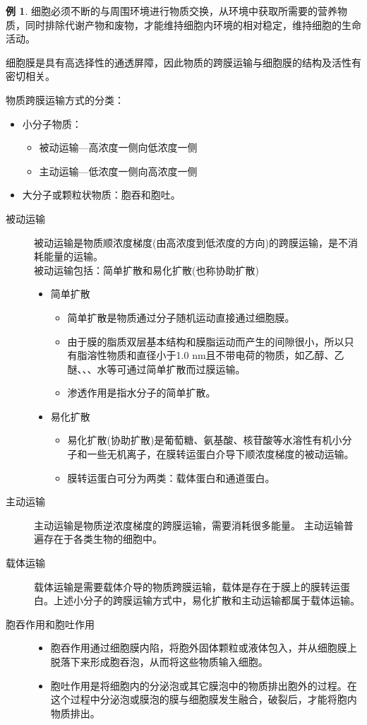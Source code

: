 \documentclass[UTF8]{article}
\theoremstyle{definition}
\newtheorem{example}{例}[section]
\begin{document}
\begin{example}
细胞必须不断的与周围环境进行物质交换，从环境中获取所需要的营养物质，同时排除代谢产物和废物，才能维持细胞内环境的相对稳定，维持细胞的生命活动。 

细胞膜是具有高选择性的通透屏障，因此物质的跨膜运输与细胞膜的结构及活性有密切相关。

物质跨膜运输方式的分类：
\begin{itemize}
    \item 小分子物质：\begin{itemize}
        \item 被动运输---高浓度一侧向低浓度一侧\item 主动运输---低浓度一侧向高浓度一侧
    \end{itemize}
    \item 大分子或颗粒状物质：胞吞和胞吐。
\end{itemize}
\begin{description}
    \item[被动运输] 被动运输是物质顺浓度梯度(由高浓度到低浓度的方向)的跨膜运输，是不消耗能量的运输。\\ 被动运输包括：简单扩散和易化扩散(也称协助扩散)\begin{itemize}
        \item 简单扩散\begin{itemize}
            \item 简单扩散是物质通过分子随机运动直接通过细胞膜。
            \item 由于膜的脂质双层基本结构和膜脂运动而产生的间隙很小，所以只有脂溶性物质和直径小于1.0 nm且不带电荷的物质，如乙醇、乙醚、、、水等可通过简单扩散而过膜运输。
            \item 渗透作用是指水分子的简单扩散。 
        \end{itemize}
        \item 易化扩散\begin{itemize}
            \item 易化扩散(协助扩散)是葡萄糖、氨基酸、核苷酸等水溶性有机小分子和一些无机离子，在膜转运蛋白介导下顺浓度梯度的被动运输。 \item 膜转运蛋白可分为两类：载体蛋白和通道蛋白。
        \end{itemize}
    \end{itemize}
    \item[主动运输] 主动运输是物质逆浓度梯度的跨膜运输，需要消耗很多能量。 主动运输普遍存在于各类生物的细胞中。
    \item[载体运输] 载体运输是需要载体介导的物质跨膜运输，载体是存在于膜上的膜转运蛋白。上述小分子的跨膜运输方式中，易化扩散和主动运输都属于载体运输。
    \item[胞吞作用和胞吐作用] \begin{itemize}
        \item 胞吞作用通过细胞膜内陷，将胞外固体颗粒或液体包入，并从细胞膜上脱落下来形成胞吞泡，从而将这些物质输入细胞。
        \item 胞吐作用是将细胞内的分泌泡或其它膜泡中的物质排出胞外的过程。在这个过程中分泌泡或膜泡的膜与细胞膜发生融合，破裂后，才能将胞内物质排出。
    \end{itemize}
\end{description}
\end{example}
\end{document}
